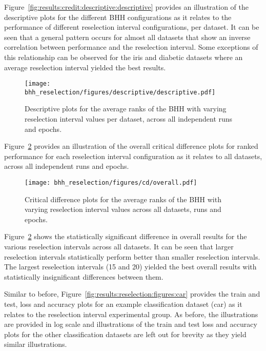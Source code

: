Figure~\ref{fig:results:credit:descriptive:descriptive} provides an illustration of the descriptive plots for the different \acs{BHH} configurations as it relates to the performance of different reselection interval configurations, per dataset. It can be seen that a general pattern occurs for almost all datasets that show an inverse correlation between performance and the reselection interval. Some exceptions of this relationship can be observed for the iris and diabetic datasets where an average reselection interval yielded the best results.

\begin{figure}[htb]
      \centering
      \texttt{[image: bhh\_reselection/figures/descriptive/descriptive.pdf]}
      \caption{Descriptive plots for the average ranks of the \acs{BHH} with varying reselection interval values per dataset, across all independent runs and epochs.}
      \label{fig:results:reselection:descriptive:descriptive}
\end{figure}

Figure~\ref{fig:results:reselection:descriptive:cd} provides an illustration of the overall critical difference plots for ranked performance for each reselection interval configuration as it relates to all datasets, across all independent runs and epochs.

\begin{figure}[htb]
      \centering
      \texttt{[image: bhh\_reselection/figures/cd/overall.pdf]}
      \caption{Critical difference plots for the average ranks of the \acs{BHH} with varying reselection interval values across all datasets, runs and epochs.}
      \label{fig:results:reselection:descriptive:cd}
\end{figure}

Figure~\ref{fig:results:reselection:descriptive:cd} shows the statistically significant difference in overall results for the various reselection intervals across all datasets. It can be seen that larger reselection intervals statistically perform better than smaller reselection intervals. The largest reselection intervals (15 and 20) yielded the best overall results with statistically insignificant differences between them.

Similar to before, Figure~\ref{fig:results:reselection:figures:car} provides the train and test, loss and accuracy plots for an example classification dataset (car) as it relates to the reselection interval experimental group. As before, the illustrations are provided in log scale and illustrations of the train and test loss and accuracy plots for the other classification datasets are left out for brevity as they yield similar illustrations.


